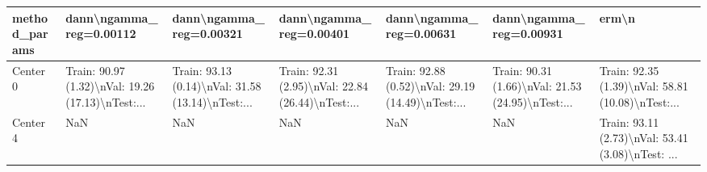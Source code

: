 \begin{tabular}{lllllll}
\toprule
method\_params &                            dann\textbackslash ngamma\_reg=0.00112 &                            dann\textbackslash ngamma\_reg=0.00321 &                            dann\textbackslash ngamma\_reg=0.00401 &                            dann\textbackslash ngamma\_reg=0.00631 &                            dann\textbackslash ngamma\_reg=0.00931 &                                              erm\textbackslash n \\
\midrule
Center 0 &  Train: 90.97 (1.32)\textbackslash nVal: 19.26 (17.13)\textbackslash nTest:... &  Train: 93.13 (0.14)\textbackslash nVal: 31.58 (13.14)\textbackslash nTest:... &  Train: 92.31 (2.95)\textbackslash nVal: 22.84 (26.44)\textbackslash nTest:... &  Train: 92.88 (0.52)\textbackslash nVal: 29.19 (14.49)\textbackslash nTest:... &  Train: 90.31 (1.66)\textbackslash nVal: 21.53 (24.95)\textbackslash nTest:... &  Train: 92.35 (1.39)\textbackslash nVal: 58.81 (10.08)\textbackslash nTest:... \\
Center 4 &                                                NaN &                                                NaN &                                                NaN &                                                NaN &                                                NaN &  Train: 93.11 (2.73)\textbackslash nVal: 53.41 (3.08)\textbackslash nTest: ... \\
\bottomrule
\end{tabular}
